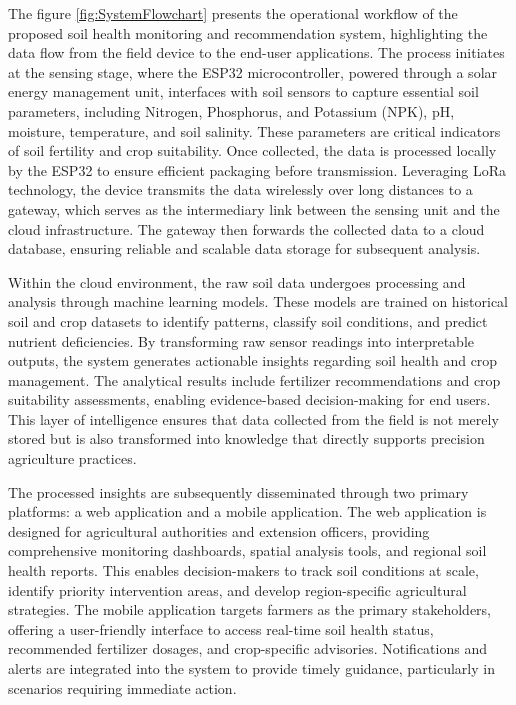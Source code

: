 {	The figure \ref{fig:SystemFlowchart} presents the operational workflow of the proposed soil health monitoring and recommendation system, highlighting the data flow from the field device to the end-user applications. The process initiates at the sensing stage, where the ESP32 microcontroller, powered through a solar energy management unit, interfaces with soil sensors to capture essential soil parameters, including Nitrogen, Phosphorus, and Potassium (NPK), pH, moisture, temperature, and soil salinity. These parameters are critical indicators of soil fertility and crop suitability. Once collected, the data is processed locally by the ESP32 to ensure efficient packaging before transmission. Leveraging LoRa technology, the device transmits the data wirelessly over long distances to a gateway, which serves as the intermediary link between the sensing unit and the cloud infrastructure. The gateway then forwards the collected data to a cloud database, ensuring reliable and scalable data storage for subsequent analysis.
	
	Within the cloud environment, the raw soil data undergoes processing and analysis through machine learning models. These models are trained on historical soil and crop datasets to identify patterns, classify soil conditions, and predict nutrient deficiencies. By transforming raw sensor readings into interpretable outputs, the system generates actionable insights regarding soil health and crop management. The analytical results include fertilizer recommendations and crop suitability assessments, enabling evidence-based decision-making for end users. This layer of intelligence ensures that data collected from the field is not merely stored but is also transformed into knowledge that directly supports precision agriculture practices.
	
	The processed insights are subsequently disseminated through two primary platforms: a web application and a mobile application. The web application is designed for agricultural authorities and extension officers, providing comprehensive monitoring dashboards, spatial analysis tools, and regional soil health reports. This enables decision-makers to track soil conditions at scale, identify priority intervention areas, and develop region-specific agricultural strategies. The mobile application targets farmers as the primary stakeholders, offering a user-friendly interface to access real-time soil health status, recommended fertilizer dosages, and crop-specific advisories. Notifications and alerts are integrated into the system to provide timely guidance, particularly in scenarios requiring immediate action.
	
}
